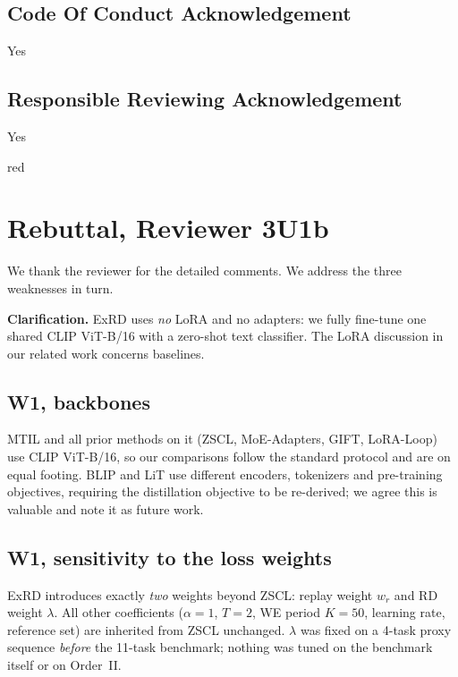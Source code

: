 \documentclass[11pt]{article}
\begin{document}
\subsection*{Code Of Conduct Acknowledgement}
Yes

\subsection*{Responsible Reviewing Acknowledgement}
Yes

\begin{color}{red}
\section*{Rebuttal, Reviewer 3U1b}

We thank the reviewer for the detailed comments. We address the three weaknesses in turn.

\textbf{Clarification.} ExRD uses \emph{no} LoRA and no adapters: we fully fine-tune one shared CLIP ViT-B/16 with a zero-shot text classifier. The LoRA discussion in our related work concerns baselines.

\subsection*{W1, backbones}

MTIL and all prior methods on it (ZSCL, MoE-Adapters, GIFT, LoRA-Loop) use CLIP ViT-B/16, so our comparisons follow the standard protocol and are on equal footing. BLIP and LiT use different encoders, tokenizers and pre-training objectives, requiring the distillation objective to be re-derived; we agree this is valuable and note it as future work.

\subsection*{W1, sensitivity to the loss weights}

ExRD introduces exactly \emph{two} weights beyond ZSCL: replay weight $w_r$ and RD weight $\lambda$. All other coefficients ($\alpha{=}1$, $T{=}2$, WE period $K{=}50$, learning rate, reference set) are inherited from ZSCL unchanged. $\lambda$ was fixed on a 4-task proxy sequence \emph{before} the 11-task benchmark; nothing was tuned on the benchmark itself or on Order~II.


\end{color}
\end{document}
